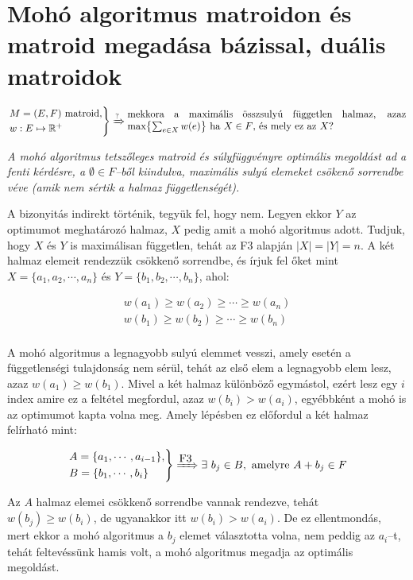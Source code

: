 \newpage
\section{Mohó algoritmus matroidon és matroid megadása bázissal, duális matroidok}

\[
\begin{rcases}
M=(E,F) \mbox{ matroid}, \\ 
w : E \mapsto \mathbb{R}^+
\end{rcases}
\xRightarrow{?} \parbox[L]{9.8cm}{mekkora a maximális összsulyú független halmaz,
azaz max$\left\{\sum_{e \in X}w(e)\right\}$ ha $X \in F$, és mely ez az $X$?}
\]

\vspace{0.4cm}
\emph{A mohó algoritmus tetszőleges matroid és súlyfüggvényre optimális
megoldást ad a fenti kérdésre, a $\emptyset \in F$--ből kiindulva, maximális
sulyú elemeket csökenő sorrendbe véve (amik nem sértik a halmaz
függetlenségét).}
\vspace{0.4cm}

A bizonyitás indirekt történik, tegyük fel, hogy nem. Legyen ekkor $Y$ az
optimumot meghatározó halmaz, $X$ pedig amit a mohó algoritmus adott. Tudjuk,
hogy $X$ és $Y$ is maximálisan független, tehát az F$3$ alapján $|X|=|Y|=n$. A
két halmaz elemeit rendezzük csökkenő sorrendbe, és írjuk fel őket mint
$X=\{a_1, a_2, \cdots, a_n\}$ és $Y=\{b_1, b_2, \cdots, b_n\}$, ahol:

\begin{align*}
w(a_1) \geq w(a_2) \geq \cdots \geq w(a_n) \\
w(b_1) \geq w(b_2) \geq \cdots \geq w(b_n) \\
\end{align*}

A mohó algoritmus a legnagyobb sulyú elemmet vesszi, amely esetén a
függetlenségi tulajdonság nem sérül, tehát az első elem a legnagyobb elem lesz,
azaz $w(a_1) \geq w(b_1)$. Mivel a két halmaz különböző egymástol, ezért lesz
egy $i$ index amire ez a feltétel megfordul, azaz $ w(b_i)> w(a_i)$, egyébbként
a mohó is az optimumot kapta volna meg. Amely lépésben ez előfordul a két halmaz
felírható mint:

\[
\begin{rcases}
A=\{a_1, \cdots, a_{i-1}\}, \\
B=\{b_1, \cdots, b_{i}\}
\end{rcases} 
\xRightarrow{\mbox{F3}} \exists~b_j \in B, \mbox{ amelyre } A + b_j \in F  
\]

Az $A$ halmaz elemei csökkenő sorrendbe vannak rendezve, tehát $w(b_j) \geq
w(b_i)$, de ugyanakkor itt $w(b_i) > w(a_i)$. De ez ellentmondás, mert ekkor a
mohó algoritmus a $b_j$ elemet választotta volna, nem peddig az $a_i$--t, tehát
feltevéssünk hamis volt, a mohó algoritmus megadja az optimális megoldást.

